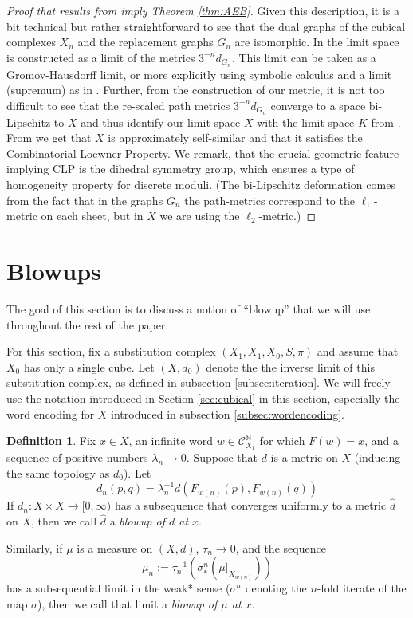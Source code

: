 \documentclass{amsart}
\theoremstyle{plain}
\theoremstyle{definition}
\newtheorem{definition}[theorem]{Definition}
\numberwithin{equation}{section}
\numberwithin{theorem}{section}
\newcommand{\N}{\mathbb{N}}
\newcommand{\cC}{\mathcal{C}}
\begin{document}
\begin{proof}[Proof that results from \cite{AEBb} imply Theorem \ref{thm:AEB}]
Given this description, it is a bit technical but rather straightforward to see that the dual graphs of the cubical complexes $X_n$ and the replacement graphs $G_n$ are isomorphic. In \cite{AEBb} the limit space  is constructed as a limit of the metrics $3^{-n}d_{G_n}$. This limit can be taken as a Gromov-Hausdorff limit, or more explicitly using symbolic calculus and a limit (supremum) as in \cite[Definition 7.10]{AEBb}. Further, from the construction of our metric, it is not too difficult to see that the re-scaled path metrics $3^{-n}d_{G_n}$ converge to a space bi-Lipschitz to $X$ and thus identify our limit space $X$ with the limit space $K$ from \cite[Definition 7.10]{AEBb}. From \cite[Theorem 1.1 and Proposition 1.7]{AEBb} we get that $X$ is approximately self-similar and that it satisfies the Combinatorial Loewner Property. We remark, that the crucial geometric feature implying CLP is the dihedral symmetry group, which ensures a type of homogeneity property for discrete moduli. (The bi-Lipschitz deformation comes from the fact that in the graphs $G_n$ the path-metrics correspond to the $\ell_1$-metric on each sheet, but in $X$ we are using the $\ell_2$-metric.) 
\end{proof}



\section{Blowups}\label{sec:blowup}
The goal of this section is to discuss a notion of ``blowup'' that we will use throughout the rest of the paper. 

For this section, fix a substitution complex $(X_1, X_1, X_0, S, \pi)$ and assume that $X_0$ has only a single cube. Let $(X,d_0)$ denote the the inverse limit of this substitution complex, as defined in subsection \ref{subsec:iteration}. We will freely use the notation introduced in Section \ref{sec:cubical} in this section, especially the word encoding for $X$ introduced in subsection \ref{subsec:wordencoding}. 



\begin{definition}\label{def:blowup}
Fix $x\in X$, an infinite word $w\in \cC_{X_1}^\N$ for which $F(w)=x$, and a sequence of positive numbers $\lambda_n \rightarrow 0$. Suppose that $d$ is a metric on $X$ (inducing the same topology as $d_0$). Let
$$ d_n(p,q) = \lambda_n^{-1} d(F_{w(n)}(p), F_{w(n)}(q))$$
If $d_n \colon X\times X \rightarrow [0,\infty)$ has a subsequence that converges uniformly to a metric $\hat{d}$ on $X$, then we call $\hat{d}$ a \emph{blowup of $d$ at $x$}.



Similarly, if $\mu$ is a measure on $(X,d)$, $\tau_n\rightarrow 0$, and the sequence
$$ \mu_n := \tau_n^{-1} (\sigma^n_*(\mu|_{X_{w(n)}}))$$
has a subsequential limit in the weak* sense ($\sigma^n$ denoting the $n$-fold iterate of the map $\sigma$), then we call that limit a \emph{blowup of $\mu$ at $x$}.
\end{definition}
\end{document}
